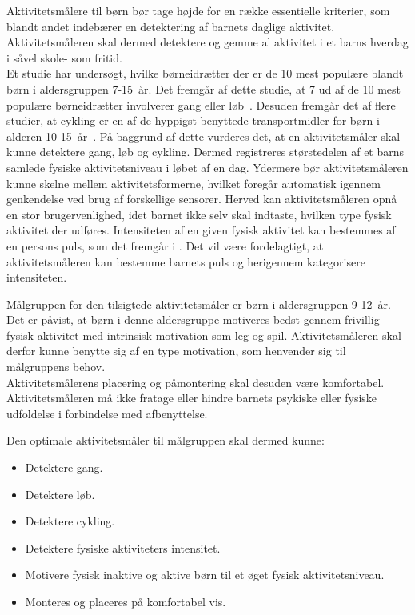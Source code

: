Aktivitetsmålere til børn bør tage højde for en række essentielle kriterier, som blandt andet indebærer en detektering af barnets daglige aktivitet. Aktivitetsmåleren skal dermed detektere og gemme al aktivitet i et barns hverdag i såvel skole- som fritid.\\
Et studie har undersøgt, hvilke børneidrætter der er de 10 mest populære blandt børn i aldersgruppen 7-15~år. Det fremgår af dette studie, at 7 ud af de 10 mest populære børneidrætter involverer gang eller løb~\citep{Asserhoej2013}. Desuden fremgår det af flere  studier, at cykling er en af de hyppigst benyttede transportmidler for børn i alderen 10-15~år~\citep{DTU2014,COWI2015}. På baggrund af dette vurderes det, at en aktivitetsmåler skal kunne detektere gang, løb og cykling. Dermed registreres størstedelen af et barns samlede fysiske aktivitetsniveau i løbet af en dag. Ydermere bør aktivitetsmåleren kunne skelne mellem aktivitetsformerne, hvilket foregår automatisk igennem genkendelse ved brug af forskellige sensorer. Herved kan aktivitetsmåleren opnå en stor brugervenlighed, idet barnet ikke selv skal indtaste, hvilken type fysisk aktivitet der udføres. \newline
Intensiteten af en given fysisk aktivitet kan bestemmes af en persons puls, som det fremgår i . Det vil være fordelagtigt, at aktivitetsmåleren kan bestemme barnets puls og herigennem kategorisere intensiteten.

Målgruppen for den tilsigtede aktivitetsmåler er børn i aldersgruppen 9-12~år. Det er påvist, at børn i denne aldersgruppe motiveres bedst gennem frivillig fysisk aktivitet med intrinsisk motivation som leg og spil. Aktivitetsmåleren skal derfor kunne benytte sig af en type motivation, som henvender sig til målgruppens behov. \\
Aktivitetsmålerens placering og påmontering skal desuden være komfortabel. Aktivitetsmåleren må ikke fratage eller hindre barnets psykiske eller fysiske udfoldelse i forbindelse med afbenyttelse. 

Den optimale aktivitetsmåler til målgruppen skal dermed kunne: 
\begin{itemize}
\item Detektere gang.
\item Detektere løb.
\item Detektere cykling. %
\item Detektere fysiske aktiviteters intensitet. %
\item Motivere fysisk inaktive og aktive børn til et øget fysisk aktivitetsniveau. %
\item Monteres og placeres på komfortabel vis.
\end{itemize}

